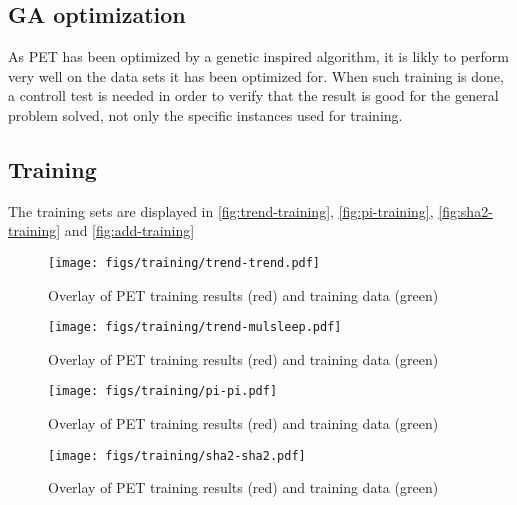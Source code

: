 \subsection{GA optimization}
As PET has been optimized by a genetic inspired algorithm, it is likly to perform very well on the data sets it
has been optimized for. When such training is done, a controll test is needed in order to verify that the result
is good for the general problem solved, not only the specific instances used for training.

\subsection{Training}

The training sets are displayed in \autoref{fig:trend-training},
\autoref{fig:pi-training}, \autoref{fig:sha2-training} and
\autoref{fig:add-training}

\begin{figure}[ht]
\centering
\texttt{[image: figs/training/trend-trend.pdf]}
\caption{Overlay of PET training results (red) and training data (green)}
\label{fig:trend-training}
\end{figure}
\begin{figure}[ht]
\centering
\texttt{[image: figs/training/trend-mulsleep.pdf]}
\caption{Overlay of PET training results (red) and training data (green)}
\label{fig:mulsleep-training}
\end{figure}
\begin{figure}[ht]
\centering
\texttt{[image: figs/training/pi-pi.pdf]}
\caption{Overlay of PET training results (red) and training data (green)}
\label{fig:pi-training}
\end{figure}
\begin{figure}[ht]
\centering
\texttt{[image: figs/training/sha2-sha2.pdf]}
\caption{Overlay of PET training results (red) and training data (green)}
\label{fig:sha2-training}
\end{figure}

